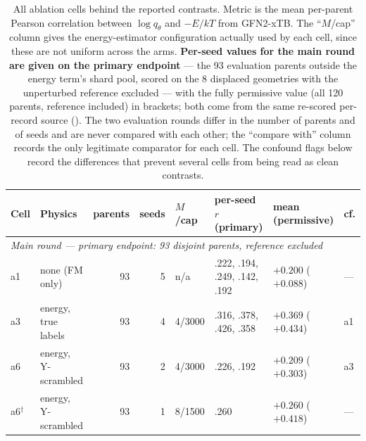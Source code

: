 \begin{table}[t]
\caption{All ablation cells behind the reported contrasts. Metric is the mean
per-parent Pearson correlation between $\log q_\theta$ and $-E/kT$ from GFN2-xTB.
The ``$M$/cap'' column gives the energy-estimator configuration actually used by
each cell, since these are not uniform across the arms. \textbf{Per-seed values
for the main round are given on the primary endpoint} --- the 93 evaluation
parents outside the energy term's shard pool, scored on the 8 displaced
geometries with the unperturbed reference excluded --- with the fully permissive
value (all 120 parents, reference included) in brackets; both come from the same
re-scored per-record source (). The two evaluation rounds differ in
the number of parents and of seeds and are never compared with each other; the
``compare with'' column records the only legitimate comparator for each cell. The
confound flags below record the differences that prevent several cells from being
read as clean contrasts.
}
\label{tab:cells}
\begin{center}
\footnotesize
\setlength{\tabcolsep}{2pt}
\begin{tabular}{llrrllll}
\toprule
Cell & Physics & parents & seeds & $M$/cap & per-seed $r$ (primary) & mean (permissive) & cf. \\
\midrule
\multicolumn{8}{l}{\emph{Main round --- primary endpoint: 93 disjoint parents, reference excluded}}\\
a1 & none (FM only) & 93 & 5 & n/a & .222, .194, .249, .142, .192 & $+0.200$ ($+0.088$) & --- \\
a3 & energy, true labels & 93 & 4 & 4/3000 & .316, .378, .426, .358 & $+0.369$ ($+0.434$) & a1 \\
a6 & energy, Y-scrambled & 93 & 2 & 4/3000 & .226, .192 & $+0.209$ ($+0.303$) & a3 \\
a6$^\dagger$ & energy, Y-scrambled & 93 & 1 & 8/1500 & .260 & $+0.260$ ($+0.418$) & --- \\

\end{tabular}
\end{center}
\end{table}
